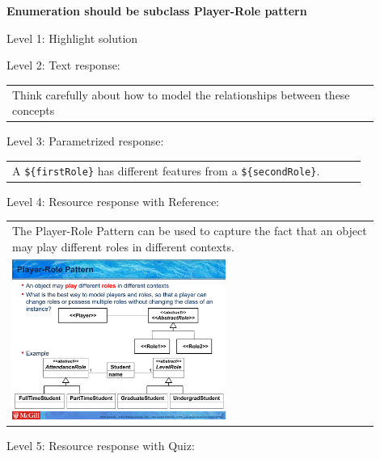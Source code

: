\noindent \textbf{Enumeration should be subclass Player-Role pattern} \medskip

\noindent Level 1: Highlight solution \medskip

\noindent Level 2: Text response: \medskip

\begin{tabular}{|p{0.9\linewidth}}
Think carefully about how to model the relationships between these concepts
\end{tabular} \medskip

\noindent Level 3: Parametrized response: \medskip

\begin{tabular}{|p{0.9\linewidth}}
A \verb|${firstRole}| has different features from a \verb|${secondRole}|.
\end{tabular} \medskip

\noindent Level 4: Resource response with Reference: \medskip

\begin{tabular}{|p{0.9\linewidth}}
The Player-Role Pattern can be used to capture the fact that an object may play different roles
in different contexts.

\\
\includegraphics[width=0.6\textwidth]{images/player_role.png}
\end{tabular} \medskip

\noindent Level 5: Resource response with Quiz: \medskip



